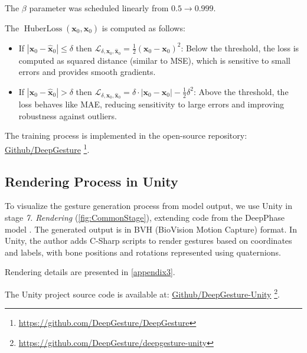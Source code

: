 The $\beta$ parameter was scheduled linearly from $0.5 \rightarrow 0.999$.

The $\operatorname{HuberLoss} (\mathbf{x}_{0},  \hat{\mathbf{x}}_{0} )$ is computed as follows:

\begin{itemize}
	\item If $|\mathbf{x}_0 - \hat{\mathbf{x}}_0| \leq \delta$ then $\mathcal{L}_{ \delta, \mathbf{x}_0, \hat{\mathbf{x}}_0} = \frac{1}{2} (\mathbf{x}_0 - \mathbf{x}_0)^2$: Below the threshold, the loss is computed as squared distance (similar to MSE), which is sensitive to small errors and provides smooth gradients.
	
	\item If $|\mathbf{x}_0 - \hat{\mathbf{x}}_0| > \delta$ then $\mathcal{L}_{ \delta, \mathbf{x}_0, \hat{\mathbf{x}}_0}  =  \delta \cdot |\mathbf{x}_0 - \mathbf{x}_0| - \frac{1}{2} \delta^2$: Above the threshold, the loss behaves like MAE, reducing sensitivity to large errors and improving robustness against outliers.
	
\end{itemize}

The training process is implemented in the open-source repository: \hyperlink{https://github.com/DeepGesture/DeepGesture}{Github/DeepGesture} \footnote{\url{https://github.com/DeepGesture/DeepGesture}}.

\subsection{Rendering Process in Unity}
\label{sec:Render}

To visualize the gesture generation process from model output, we use Unity in stage \textit{7. Rendering} (\autoref{fig:CommonStage}), extending code from the DeepPhase model \cite{starke2022deepphase}. The generated output is in BVH (BioVision Motion Capture) format. In Unity, the author adds C-Sharp scripts to render gestures based on coordinates and labels, with bone positions and rotations represented using quaternions.

Rendering details are presented in \autoref{appendix3}.

The Unity project source code is available at: \hyperlink{https://github.com/DeepGesture/deepgesture-unity}{Github/DeepGesture-Unity}
\footnote{\url{https://github.com/DeepGesture/deepgesture-unity}}.











